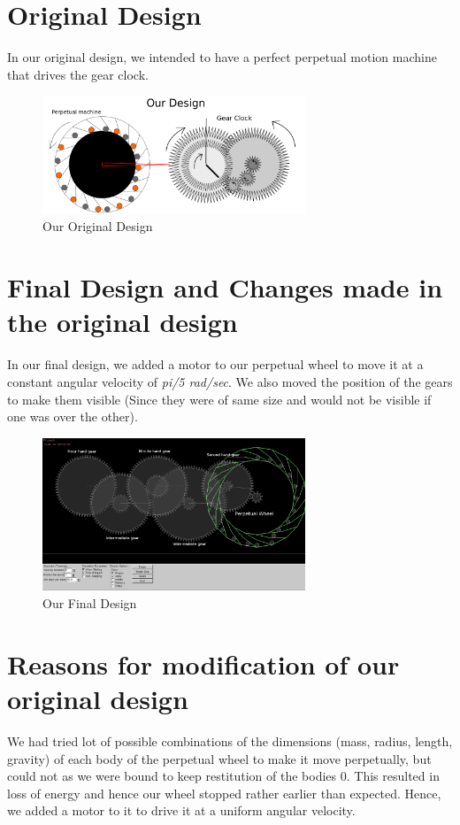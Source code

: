 \documentclass[10pt]{article} \usepackage[a4paper,left=0.8in,right=0.8in,top=0.4in,bottom=0.8in]{geometry} \usepackage{graphicx}
\begin{document}
\section{Original Design}
In our original design, we intended to have a perfect perpetual motion machine that drives the gear clock.

\begin{figure}[ht!]
\centering
\includegraphics[width=0.7\textwidth]{images/project.png}
\caption{Our Original Design}
\end{figure}

\section{Final Design and Changes made in the original design}
In our final design, we added a motor to our perpetual wheel to move it at a constant angular velocity of \textit{pi/5 rad/sec}. We also moved the position of the gears to make them visible (Since they were of same size and would not be visible if one was over the other).

\begin{figure}[ht!]
\centering
\includegraphics[width=0.7\textwidth]{images/final.png}
\caption{Our Final Design}
\end{figure}

\section{Reasons for modification of our original design}
We had tried lot of possible combinations of the dimensions (mass, radius, length, gravity) of each body of the perpetual wheel to make it move perpetually, but could not as we were bound to keep restitution of the bodies 0. This resulted in loss of energy and hence our wheel stopped rather earlier than expected. Hence, we added a motor to it to drive it at a uniform angular velocity.
\end{document}
